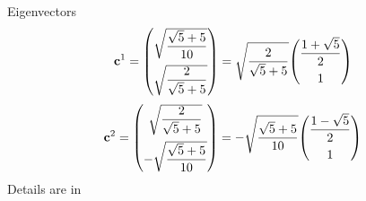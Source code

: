 \documentclass[a4paper]{article}
\begin{document}
Eigenvectors
\begin{equation}\label{key}
\vb{c}^1 
= \mqty(\sqrt{\dfrac{\sqrt{5}+5}{10}}\vspace{5pt}\\ \sqrt{\dfrac{2}{\sqrt{5}+5}}) 
= \sqrt{\dfrac{2}{\sqrt{5}+5}} 
\mqty(\dfrac{1+\sqrt{5}}{2} \vspace{5pt}\\1) 
\end{equation}
\begin{equation}\label{key}
\vb{c}^2
= \mqty(\sqrt{\dfrac{2}{\sqrt{5}+5}}\vspace{5pt}\\ -\sqrt{\dfrac{\sqrt{5}+5}{10}}) 
= -\sqrt{\dfrac{\sqrt{5}+5}{10}}
\mqty(\dfrac{1-\sqrt{5}}{2} \vspace{5pt}\\1) 
\end{equation}
Details are in 
\end{document}

